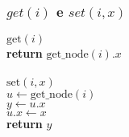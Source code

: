 \documentclass{beamer}
\begin{document}
\begin{frame}
\frametitle{$get(i)$ e $set(i,x)$}
\begin{oframed}
\begin{flushleft}
\hspace*{1em} \ensuremath{\mathrm{get}(\ensuremath{\mathit{i}})}\\

\hspace*{1em} \hspace*{1em} {\color{black} \textbf{return}} \ensuremath{\mathrm{get\_node}(\ensuremath{\mathit{i}}).\ensuremath{\mathit{x}}}\\
\ \\
\hspace*{1em} \ensuremath{\mathrm{set}(\ensuremath{\mathit{i}}, \ensuremath{\mathit{x}})} \\

\hspace*{1em} \hspace*{1em} \ensuremath{\ensuremath{\mathit{u}} \gets  \ensuremath{\mathrm{get\_node}(\ensuremath{\mathit{i}})}}\\
\hspace*{1em} \hspace*{1em} \ensuremath{\ensuremath{\mathit{y}} \gets  \ensuremath{\ensuremath{\mathit{u}}.x}}\\
\hspace*{1em} \hspace*{1em} \ensuremath{\ensuremath{\mathit{u}}.\ensuremath{x} \gets  \ensuremath{x}}\\
\hspace*{1em} \hspace*{1em} {\color{black} \textbf{return}} \ensuremath{\ensuremath{\mathit{y}}}\\
\end{flushleft}
\end{oframed}
\end{frame}
\end{document}
